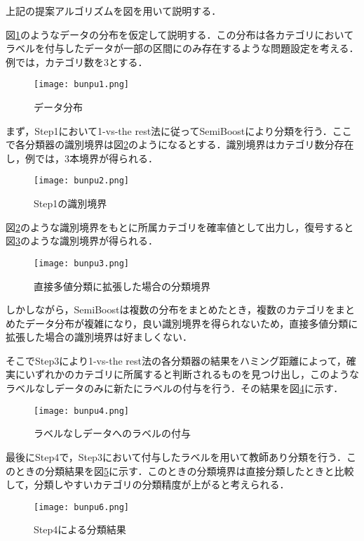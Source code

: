 上記の提案アルゴリズムを図を用いて説明する．\par
図\ref{bunpu1}のようなデータの分布を仮定して説明する．この分布は各カテゴリにおいてラベルを付与したデータが一部の区間にのみ存在するような問題設定を考える．例では，カテゴリ数を3とする．
\begin{figure}[H]
\centering
\texttt{[image: bunpu1.png]}
\caption{データ分布}
\label{bunpu1}
\end{figure}\par
\newpage
まず，Step1において1-vs-the rest法に従ってSemiBoostにより分類を行う．ここで各分類器の識別境界は図\ref{bunpu2}のようになるとする．識別境界はカテゴリ数分存在し，例では，3本境界が得られる．
\begin{figure}[H]
\centering
\texttt{[image: bunpu2.png]}
\caption{Step1の識別境界}
\label{bunpu2}
\end{figure}\par

図\ref{bunpu2}のような識別境界をもとに所属カテゴリを確率値として出力し，復号すると図\ref{bunpu3}のような識別境界が得られる．

\begin{figure}[H]
\centering
\texttt{[image: bunpu3.png]}
\caption{直接多値分類に拡張した場合の分類境界}
\label{bunpu3}
\end{figure}\par

しかしながら，SemiBoostは複数の分布をまとめたとき，複数のカテゴリをまとめたデータ分布が複雑になり，良い識別境界を得られないため，直接多値分類に拡張した場合の識別境界は好ましくない．\par

そこでStep3により1-vs-the rest法の各分類器の結果をハミング距離によって，確実にいずれかのカテゴリに所属すると判断されるものを見つけ出し，このようなラベルなしデータのみに新たにラベルの付与を行う．その結果を図\ref{bunpu4}に示す．

\begin{figure}[H]
\centering
\texttt{[image: bunpu4.png]}
\caption{ラベルなしデータへのラベルの付与}
\label{bunpu4}
\end{figure}\par

最後にStep4で，Step3において付与したラベルを用いて教師あり分類を行う．このときの分類結果を図\ref{bunpu6}に示す．このときの分類境界は直接分類したときと比較して，分類しやすいカテゴリの分類精度が上がると考えられる．

\begin{figure}[H]
\centering
\texttt{[image: bunpu6.png]}
\caption{Step4による分類結果}
\label{bunpu6}
\end{figure}





